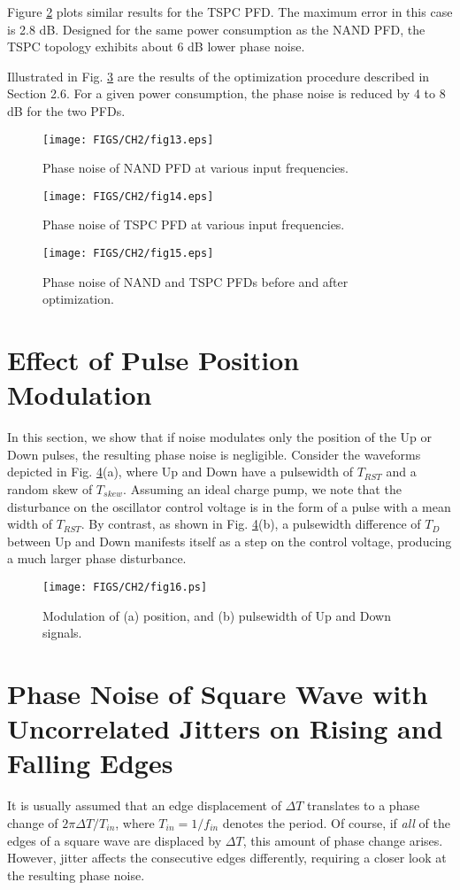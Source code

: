 Figure \ref{fig:pfdtspcsim} plots similar results for the TSPC PFD. The maximum error in this case is 2.8 dB. Designed for the same power
consumption as the NAND PFD, the TSPC topology exhibits about 6 dB lower phase noise.

Illustrated in Fig. \ref{fig:pfdoptim} are the results of the optimization procedure described in
Section 2.6. For a given power consumption, the phase noise is
reduced by 4 to 8 dB for the two PFDs.

\begin{figure}[htb!]
\centering
\texttt{[image: FIGS/CH2/fig13.eps]}
\caption{Phase noise of NAND PFD at various input frequencies.}
\label{fig:pfdnandsim}
\end{figure} 
\begin{figure}[htb!]
\centering
\texttt{[image: FIGS/CH2/fig14.eps]}
\caption{Phase noise of TSPC PFD at various input frequencies.}
\label{fig:pfdtspcsim}
\end{figure} 
\begin{figure}[htb!]
\centering
\texttt{[image: FIGS/CH2/fig15.eps]}
\caption{Phase noise of NAND and TSPC PFDs before and after optimization.}
\label{fig:pfdoptim}
\end{figure} 




\section{Effect of Pulse Position Modulation}
In this section, we show that if noise modulates only the position of the Up or Down pulses, the resulting phase noise is negligible. Consider the waveforms
depicted in Fig. \ref{fig:ppmcompare}(a), where Up and Down have a pulsewidth of $T_{RST}$ and a random skew of $T_{skew}$. Assuming an ideal charge pump, we note that the
disturbance on the oscillator control voltage is in the form of a pulse with a mean width of $T_{RST}$. By contrast, as shown in Fig. \ref{fig:ppmcompare}(b), a pulsewidth
difference of $T_D$ between Up and Down manifests itself as a step on the control voltage, producing a much larger phase disturbance. 
\begin{figure}[htb!]
\centering
\texttt{[image: FIGS/CH2/fig16.ps]}
\caption{Modulation of (a) position, and (b) pulsewidth of Up and Down signals.}
\label{fig:ppmcompare}
\end{figure}

\section{Phase Noise of Square Wave with Uncorrelated Jitters on Rising and Falling Edges}
It is usually assumed that an edge displacement of $\Delta T$ translates to a phase change of $2\pi \Delta T / T_{in}$, where $T_{in}=1/f_{in}$ denotes the period. Of
course, if {\em all} of the edges of a square wave are displaced by $\Delta T$, this amount of phase change arises. However, jitter affects the consecutive edges
differently, requiring a closer look at the resulting phase noise.

